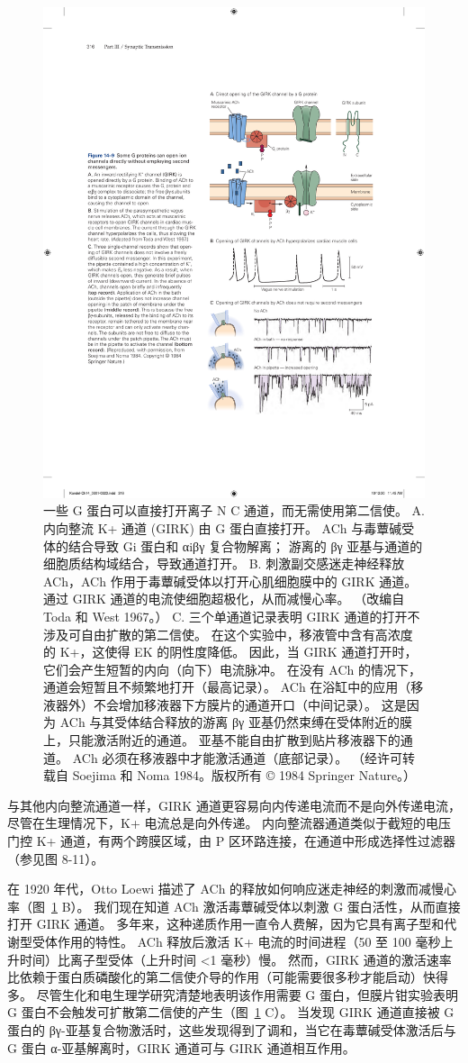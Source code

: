 \begin{figure}[htbp]
	\centering
	\includegraphics[width=0.65\linewidth]{chap14/fig_14_9}
	\caption{一些 G 蛋白可以直接打开离子 N C 通道，而无需使用第二信使。 A. 内向整流 K+ 通道 (GIRK) 由 G 蛋白直接打开。 ACh 与毒蕈碱受体的结合导致 Gi 蛋白和 αiβγ 复合物解离； 游离的 βγ 亚基与通道的细胞质结构域结合，导致通道打开。 B. 刺激副交感迷走神经释放 ACh，ACh 作用于毒蕈碱受体以打开心肌细胞膜中的 GIRK 通道。 通过 GIRK 通道的电流使细胞超极化，从而减慢心率。 （改编自 Toda 和 West 1967。） C. 三个单通道记录表明 GIRK 通道的打开不涉及可自由扩散的第二信使。 在这个实验中，移液管中含有高浓度的 K+，这使得 EK 的阴性度降低。 因此，当 GIRK 通道打开时，它们会产生短暂的内向（向下）电流脉冲。 在没有 ACh 的情况下，通道会短暂且不频繁地打开（最高记录）。 ACh 在浴缸中的应用（移液器外）不会增加移液器下方膜片的通道开口（中间记录）。 这是因为 ACh 与其受体结合释放的游离 βγ 亚基仍然束缚在受体附近的膜上，只能激活附近的通道。 亚基不能自由扩散到贴片移液器下的通道。 ACh 必须在移液器中才能激活通道（底部记录）。 （经许可转载自 Soejima 和 Noma 1984。版权所有 © 1984 Springer Nature。）}
	\label{fig:14_9}
\end{figure}


与其他内向整流通道一样，GIRK 通道更容易向内传递电流而不是向外传递电流，尽管在生理情况下，K+ 电流总是向外传递。
内向整流器通道类似于截短的电压门控 K+ 通道，有两个跨膜区域，由 P 区环路连接，在通道中形成选择性过滤器（参见图 8-11）。


在 1920 年代，Otto Loewi 描述了 ACh 的释放如何响应迷走神经的刺激而减慢心率（图~\ref{fig:14_9} B）。
我们现在知道 ACh 激活毒蕈碱受体以刺激 G 蛋白活性，从而直接打开 GIRK 通道。
多年来，这种递质作用一直令人费解，因为它具有离子型和代谢型受体作用的特性。
ACh 释放后激活 K+ 电流的时间进程（50 至 100 毫秒上升时间）比离子型受体（上升时间 <1 毫秒）慢。
然而，GIRK 通道的激活速率比依赖于蛋白质磷酸化的第二信使介导的作用（可能需要很多秒才能启动）快得多。 
尽管生化和电生理学研究清楚地表明该作用需要 G 蛋白，但膜片钳实验表明 G 蛋白不会触发可扩散第二信使的产生（图~\ref{fig:14_9} C）。
当发现 GIRK 通道直接被 G 蛋白的 βγ-亚基复合物激活时，这些发现得到了调和，当它在毒蕈碱受体激活后与 G 蛋白 α-亚基解离时，GIRK 通道可与 GIRK 通道相互作用。


